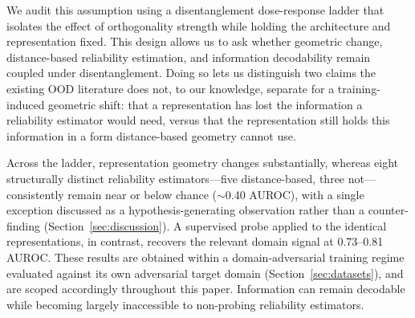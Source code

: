 We audit this assumption using a disentanglement dose-response ladder that isolates the effect of orthogonality strength while holding the architecture and representation fixed. This design allows us to ask whether geometric change, distance-based reliability estimation, and information decodability remain coupled under disentanglement. Doing so lets us distinguish two claims the existing OOD literature does not, to our knowledge, separate for a training-induced geometric shift: that a representation has lost the information a reliability estimator would need, versus that the representation still holds this information in a form distance-based geometry cannot use.

Across the ladder, representation geometry changes substantially, whereas eight structurally distinct reliability estimators---five distance-based, three not---consistently remain near or below chance ($\sim$0.40 AUROC), with a single exception discussed as a hypothesis-generating observation rather than a counter-finding (Section~\ref{sec:discussion}). A supervised probe applied to the identical representations, in contrast, recovers the relevant domain signal at 0.73--0.81 AUROC. These results are obtained within a domain-adversarial training regime evaluated against its own adversarial target domain (Section~\ref{sec:datasets}), and are scoped accordingly throughout this paper. Information can remain decodable while becoming largely inaccessible to non-probing reliability estimators.
